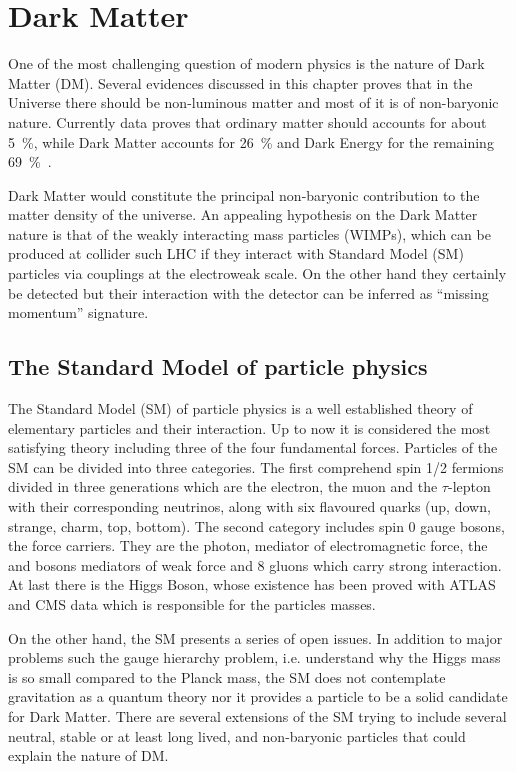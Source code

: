 \chapter{Dark Matter}
\label{chapt:dm}
\lettrine{O}{}ne of the most challenging question of modern physics is the nature of Dark Matter (DM). Several evidences discussed in this chapter proves that in the Universe there should be non-luminous matter and most of it is of non-baryonic nature. Currently data proves that ordinary matter should accounts for about \SI{5}{\percent}, while Dark Matter accounts for \SI{26}{\percent} and Dark Energy for the remaining \SI{69}{\percent}~\cite{Planck:results}.

Dark Matter would constitute the principal non-baryonic contribution to the matter density of the universe. An appealing hypothesis on the Dark Matter nature is that of the weakly interacting mass particles (WIMPs), which can be produced at collider such LHC if they interact with Standard Model (SM) particles via couplings at the electroweak scale. On the other hand they certainly be detected but their interaction with the detector can be inferred as ``missing momentum'' signature. 

\section{The Standard Model of particle physics}
The Standard Model (SM) of particle physics is a well established theory of elementary particles and their interaction. Up to now it is considered the most satisfying theory including three of the four fundamental forces.
Particles of the SM can be divided into three categories. The first comprehend spin \num{1/2} fermions divided in three generations which are the electron, the muon and the $\tau$-lepton with their corresponding neutrinos, along with six flavoured quarks (up, down, strange, charm, top, bottom). The second category includes spin 0 gauge bosons, the force carriers. They are the photon, mediator of electromagnetic force, the \Zboson and \Wboson bosons mediators of weak force and 8 gluons which carry strong interaction. At last there is the Higgs Boson, whose existence has been proved with \RunOne ATLAS and CMS data which is responsible for the particles masses.

On the other hand, the SM presents a series of open issues. In addition to major problems such the gauge hierarchy problem, i.e. understand why the Higgs mass is so small compared to the Planck mass, the SM does not contemplate gravitation as a quantum theory nor it provides a particle to be a solid candidate for Dark Matter. There are several extensions of the SM trying to include several neutral, stable or at least long lived, and non-baryonic particles that could explain the nature of DM.

